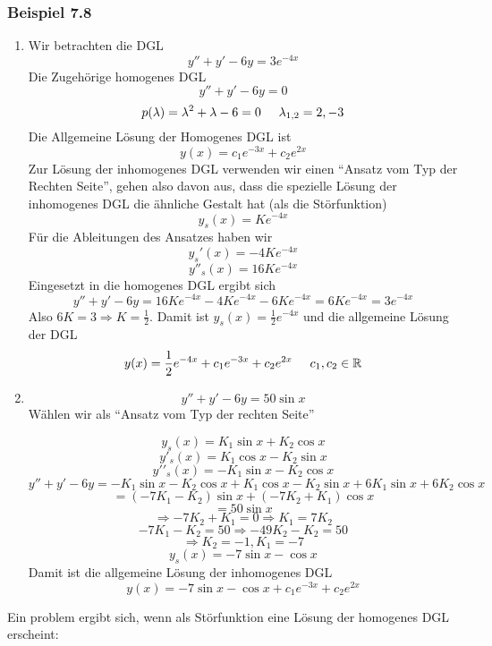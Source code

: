 \subsubsection*{Beispiel 7.8}
\begin{enumerate}
\item Wir betrachten die DGL \[y''+y'-6y=3e^{-4x}\]Die Zugehörige homogenes DGL \[y''+y'-6y=0\]
\[p(\lambda)=\lambda^2+\lambda-6=0\text{\hspace{5mm}}\lambda_{1,2}=2,-3\] Die Allgemeine Lösung der Homogenes DGL ist \[y(x)=c_1e^{-3x}+c_2e^{2x}\] Zur Lösung der inhomogenes DGL verwenden wir einen ``Ansatz vom Typ der Rechten Seite'', gehen also davon aus, dass die spezielle Lösung der inhomogenes DGL die ähnliche Gestalt hat (als die Störfunktion) \[y_s(x)=Ke^{-4x}\]Für die Ableitungen des Ansatzes haben wir \[y_s'(x)=-4Ke^{-4x}\]
\[y''_s(x)=16Ke^{-4x}\]Eingesetzt in die homogenes DGL ergibt sich \[y''+y'-6y=16Ke^{-4x}-4Ke^{-4x}-6Ke^{-4x}=6Ke^{-4x}=3e^{-4x}\]Also $6K=3\Rightarrow K=\frac{1}{2}$. Damit ist $y_s(x)=\frac{1}{2}e^{-4x}$ und die allgemeine Lösung der DGL \[y(x)=\frac{1}{2}e^{-4x}+c_1e^{-3x}+c_2e^{2x}\text{\hspace{5mm}}c_1,c_2\in\mathbb{R}\]
\item \[y''+y'-6y=50\sin x\] Wählen wir als ``Ansatz vom Typ der rechten Seite''

\[{y_s}(x) = {K_1}\sin x + {K_2}\cos x\]
\[y{'_s}(x) = {K_1}\cos x - {K_2}\sin x\]
\[y'{'_s}(x) =  - {K_1}\sin x - {K_2}\cos x\]
\[y'' + y' - 6y =  - {K_1}\sin x - {K_2}\cos x + {K_1}\cos x - {K_2}\sin x + 6{K_1}\sin x + 6{K_2}\cos x\]
\[ = ( - 7{K_1} - {K_2})\sin x + ( - 7{K_2} + {K_1})\cos x\]
\[ = 50\sin x\]
\[ \Rightarrow  - 7{K_2} + {K_1} = 0 \Rightarrow {K_1} = 7{K_2}\]
\[ - 7{K_1} - {K_2} = 50 \Rightarrow  - 49{K_2} - {K_2} = 50\]
\[ \Rightarrow {K_2} =  - 1,{K_1} =  - 7\]
\[y_s(x)=-7\sin x-\cos x\]
Damit ist die allgemeine Lösung der inhomogenes DGL \[y(x)=-7\sin x-\cos x+c_1e^{-3x}+c_2e^{2x}\]
\end{enumerate}
Ein problem ergibt sich, wenn als Störfunktion eine Lösung der homogenes DGL erscheint:

